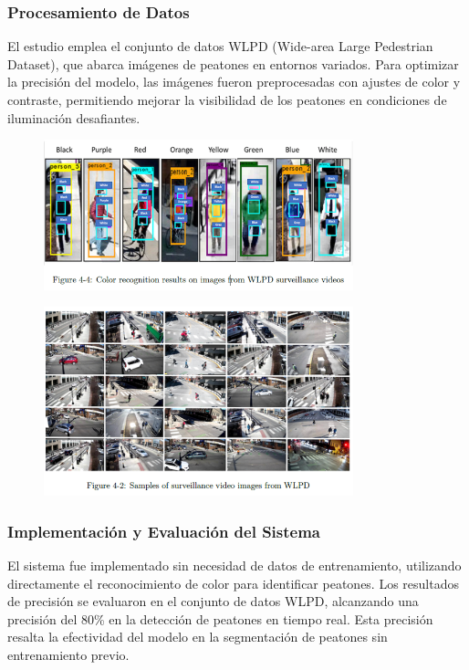 \documentclass[listof=nochaptergap,12pt,times,authoryear]{report}
\begin{document}
\subsubsection{Procesamiento de Datos}
El estudio emplea el conjunto de datos WLPD (Wide-area Large Pedestrian Dataset), que abarca imágenes de peatones en entornos variados. Para optimizar la precisión del modelo, las imágenes fueron preprocesadas con ajustes de color y contraste, permitiendo mejorar la visibilidad de los peatones en condiciones de iluminación desafiantes.

\begin{figure}[h] %
    \centering
    \includegraphics[width=0.8\textwidth]{pro6.png} %
    \label{fig:ejemplo} %
\end{figure}

\begin{figure}[h] %
    \centering
    \includegraphics[width=0.8\textwidth]{pro6.1.png} %
    \label{fig:ejemplo} %
\end{figure}


\subsubsection{Implementación y Evaluación del Sistema}
El sistema fue implementado sin necesidad de datos de entrenamiento, utilizando directamente el reconocimiento de color para identificar peatones. Los resultados de precisión se evaluaron en el conjunto de datos WLPD, alcanzando una precisión del 80\% en la detección de peatones en tiempo real. Esta precisión resalta la efectividad del modelo en la segmentación de peatones sin entrenamiento previo.
\end{document}
